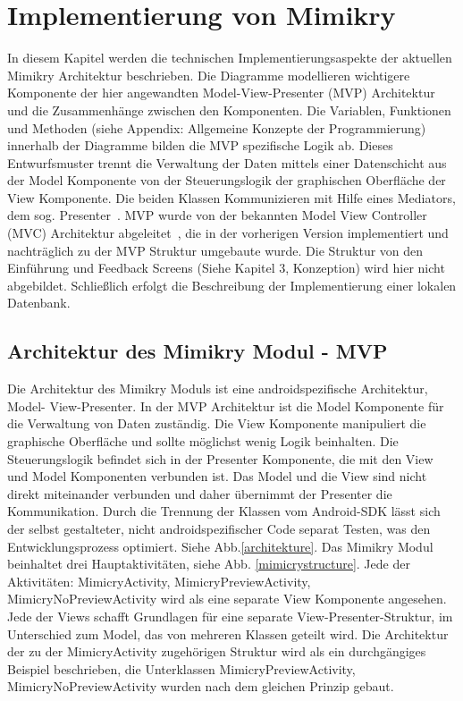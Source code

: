 \section{Implementierung von Mimikry}
In diesem Kapitel werden die technischen Implementierungsaspekte der aktuellen Mimikry Architektur beschrieben. Die Diagramme modellieren wichtigere Komponente der hier angewandten Model-View-Presenter (MVP) Architektur und die Zusammenhänge zwischen den Komponenten. Die Variablen, Funktionen und Methoden (siehe Appendix: Allgemeine Konzepte der Programmierung) innerhalb der Diagramme bilden die MVP spezifische Logik ab. 
Dieses Entwurfsmuster trennt die Verwaltung der Daten mittels einer Datenschicht aus der Model Komponente von der Steuerungslogik der graphischen Oberfläche der View Komponente. Die beiden Klassen Kommunizieren mit Hilfe eines Mediators, dem sog. Presenter~\cite{mvc}. MVP wurde von der bekannten Model View Controller (MVC) Architektur abgeleitet~\cite{Sok.214}, die in der vorherigen Version implementiert und nachträglich zu der MVP Struktur umgebaute wurde. Die Struktur von den Einführung und Feedback Screens (Siehe Kapitel 3, Konzeption) wird hier nicht abgebildet. Schließlich erfolgt die Beschreibung der Implementierung einer lokalen Datenbank.

\subsection{Architektur des Mimikry Modul - MVP}
Die Architektur des Mimikry Moduls ist eine androidspezifische Architektur, \\Model- View-Presenter. In der MVP Architektur ist die Model Komponente für die Verwaltung von Daten zuständig. Die View Komponente manipuliert die graphische Oberfläche und sollte möglichst wenig Logik beinhalten. Die Steuerungslogik befindet sich in der Presenter Komponente, die mit den View und Model Komponenten verbunden ist. Das Model und die View sind nicht direkt miteinander verbunden und daher übernimmt der Presenter die Kommunikation. Durch die Trennung der Klassen vom Android-SDK lässt sich der selbst gestalteter, nicht androidspezifischer Code separat Testen, was den Entwicklungsprozess optimiert. Siehe Abb.\ref{architekture}. 
Das Mimikry Modul beinhaltet drei Hauptaktivitäten, siehe Abb. \ref{mimicrystructure}. Jede der Aktivitäten: MimicryActivity, MimicryPreviewActivity, MimicryNoPreviewActivity wird als eine separate View Komponente angesehen. Jede der Views schafft Grundlagen für eine separate View-Presenter-Struktur, im Unterschied zum Model, das von mehreren Klassen geteilt wird. 
Die Architektur der zu der MimicryActivity zugehörigen Struktur wird als ein durchgängiges Beispiel beschrieben, die Unterklassen MimicryPreviewActivity, MimicryNoPreviewActivity wurden nach dem gleichen Prinzip gebaut.

